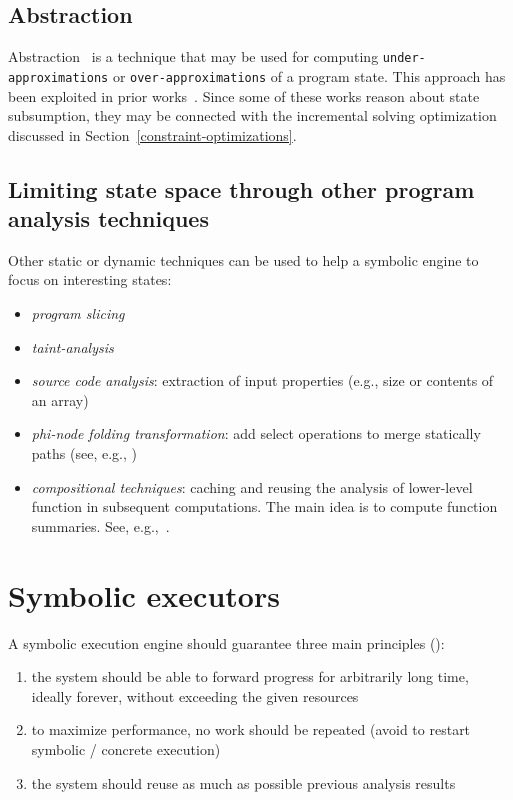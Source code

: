 \subsection{Abstraction}

Abstraction~\cite{C-SEFM07} is a technique that may be used for computing {\tt under-approximations} or {\tt over-approximations} of a program state. This approach has been exploited in prior works~\cite{APV-SPIN06,VPP-ISSTA06,XGM-ISSTA08}. Since some of these works reason about state subsumption, they may be connected with the incremental solving optimization discussed in Section~\ref{constraint-optimizations}.


\subsection{Limiting state space through other program analysis techniques}

Other static or dynamic techniques can be used to help a symbolic engine to focus on interesting states:
\begin{itemize}
  \item {\em program slicing}
  \item {\em taint-analysis}
  \item {\em source code analysis}: extraction of input properties (e.g., size or contents of an array)
  \item {\em phi-node folding transformation}: add select operations to merge statically paths (see, e.g., \cite{CCK-EUROSYS11})
  \item {\em compositional techniques}: caching and reusing the analysis of lower-level function in subsequent computations. The main idea is to compute function summaries. See, e.g.,~\cite{G-POPL07,G-PLDI11,MS-TR07}.
\end{itemize}


\section{Symbolic executors}

A symbolic execution engine should guarantee three main principles (\cite{MAYHEM-SP12}):
\begin{enumerate}
  \item the system should be able to forward progress for arbitrarily long time, ideally forever, without exceeding the given resources
  \item to maximize performance, no work should be repeated (avoid to restart symbolic / concrete execution)
  \item the system should reuse as much as possible previous analysis results
\end{enumerate}


